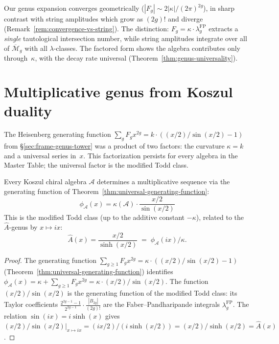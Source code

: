 \begin{remark}
\label{rem:growth-vs-string}
Our genus expansion converges geometrically ($|F_g| \sim 2|\kappa|/(2\pi)^{2g}$), in sharp contrast with string amplitudes which grow as $(2g)!$ and diverge (Remark~\ref{rem:convergence-vs-string}).  The distinction: $F_g = \kappa \cdot \lambda_g^{\mathrm{FP}}$ extracts a \emph{single} tautological intersection number, while string amplitudes integrate over all of $\overline{\mathcal{M}}_g$ with all $\lambda$-classes.  The factored form shows the algebra contributes only through~$\kappa$, with the decay rate universal (Theorem~\ref{thm:genus-universality}).
\end{remark}


\section{Multiplicative genus from Koszul duality}\label{sec:multiplicative-genus}

The Heisenberg generating function $\sum_g F_g x^{2g} = k \cdot ((x/2)/\sin(x/2) - 1)$ from \S\ref{sec:frame-genus-tower} was a product of two factors: the curvature $\kappa = k$ and a universal series in~$x$.  This factorization persists for every algebra in the Master Table; the universal factor is the modified Todd class.

\begin{proposition}
\label{prop:multiplicative-genus}
Every Koszul chiral algebra $\mathcal{A}$ determines a multiplicative sequence via the generating function of Theorem~\textup{\ref{thm:universal-generating-function}}:
\begin{equation}\label{eq:multiplicative-genus}
\phi_{\mathcal{A}}(x) = \kappa(\mathcal{A}) \cdot \frac{x/2}{\sin(x/2)}
\end{equation}
This is the modified Todd class \textup{(}up to the additive constant $-\kappa$\textup{)}, related to the $\hat{A}$-genus by $x \mapsto ix$:
\begin{equation}
\hat{A}(x) = \frac{x/2}{\sinh(x/2)} \;=\; \phi_{\mathcal{A}}(ix)/\kappa.
\end{equation}
\end{proposition}

\begin{proof}
The generating function $\sum_{g \geq 1} F_g x^{2g} = \kappa \cdot ((x/2)/\sin(x/2) - 1)$ (Theorem~\ref{thm:universal-generating-function}) identifies $\phi_{\mathcal{A}}(x) = \kappa + \sum_{g \geq 1} F_g x^{2g} = \kappa \cdot (x/2)/\sin(x/2)$.  The function $(x/2)/\sin(x/2)$ is the generating function of the modified Todd class: its Taylor coefficients $\frac{2^{2g-1}-1}{2^{2g-1}} \cdot \frac{|B_{2g}|}{(2g)!}$ are the Faber--Pandharipande integrals $\lambda_g^{\mathrm{FP}}$.  The relation $\sin(ix) = i\sinh(x)$ gives $(x/2)/\sin(x/2)|_{x \mapsto ix} = (ix/2)/(i\sinh(x/2)) = (x/2)/\sinh(x/2) = \hat{A}(x)$.
\end{proof}

